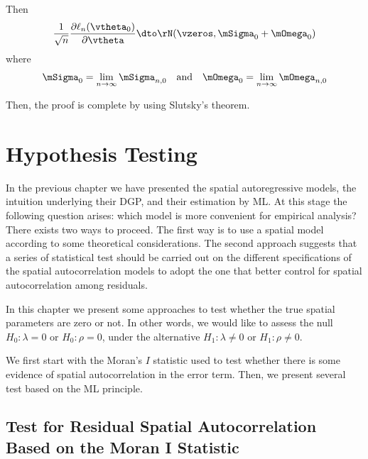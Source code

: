 \documentclass[english,12pt]{book}\usepackage[]{graphicx}\usepackage[]{xcolor}
\begin{document}
\begin{subappendices}
\begin{enumerate}
Then 
\begin{equation*}
  \frac{1}{\sqrt{n}}\frac{\partial \ell_n(\vtheta_0)}{\partial \vtheta} \dto \rN(\vzeros, \mSigma_0 + \mOmega_0)
\end{equation*}
%
where 
\begin{equation}
\mSigma_0 = \lim_{n\to \infty}\mSigma_{n, 0}\quad \mbox{and} \quad \mOmega_0 = \lim_{n\to \infty}\mOmega_{n, 0}
\end{equation}
\end{enumerate}

Then, the proof is complete by using Slutsky's theorem. 
\end{subappendices}



\chapter{Hypothesis Testing}

In the previous chapter we have presented the spatial autoregressive models, the intuition underlying their DGP, and their estimation by ML. At this stage the following question arises: which model is more convenient for empirical analysis? There exists two ways to proceed. The first way is to use a spatial model according to some theoretical considerations. The second approach suggests that a series of statistical test should be carried out on the different specifications of the spatial autocorrelation models to adopt the one that better control for spatial autocorrelation among residuals. 

In this chapter we present some approaches to test whether the true spatial parameters are zero or not. In other words, we would like to assess the null $H_0:\lambda = 0$ or $H_0: \rho = 0$, under the alternative $H_1: \lambda \neq 0$ or $H_1:\rho \neq 0$.

We first start with the Moran's $I$ statistic used to test whether there is some evidence of spatial autocorrelation in the error term. Then, we present several test based on the ML principle. 


\section{Test for Residual Spatial Autocorrelation Based on the Moran I Statistic}
\end{document}

